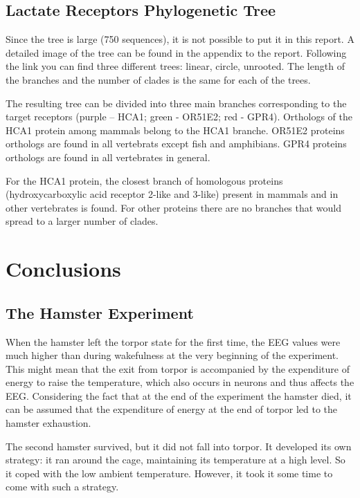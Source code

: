 \documentclass[14pt,a4paper]{scrartcl}
\begin{document}
\subsection{Lactate Receptors Phylogenetic Tree}
\label{sec:Results:Lactate Receptors Phylogenetic Tree}

Since the tree is large (750 sequences), it is not possible to put it in this report. A detailed image of the tree can be found in the appendix to the report. Following the link you can find three different trees: linear, circle, unrooted. The length of the branches and the number of clades is the same for each of the trees.

The resulting tree can be divided into three main branches corresponding to the target receptors (purple – HCA1; green - OR51E2; red - GPR4). Orthologs of the HCA1 protein among mammals belong to the HCA1 branche. OR51E2 proteins orthologs are found in all vertebrats except fish and amphibians. GPR4 proteins orthologs are found in all vertebrates in general. 

For the HCA1 protein, the closest branch of homologous proteins (hydroxycarboxylic acid receptor 2-like and 3-like) present in mammals and in other vertebrates is found. For other proteins there are no branches that would spread to a larger number of clades.







\newpage
\section{Conclusions}
\label{sec:Conclusions} 

\subsection{The Hamster Experiment}
\label{sec:Conclusions:The Hamster Experiment} 

When the hamster left the torpor state for the first time, the EEG values were much higher than during wakefulness at the very beginning of the experiment. This might mean that the exit from torpor is accompanied by the expenditure of energy to raise the temperature, which also occurs in neurons and thus affects the EEG. Considering the fact that at the end of the experiment the hamster died, it can be assumed that the expenditure of energy at the end of torpor led to the hamster exhaustion.

The second hamster survived, but it did not fall into torpor. It developed its own strategy: it ran around the cage, maintaining its temperature at a high level. So it coped with the low ambient temperature. However, it took it some time to come with such a strategy.
\end{document}
